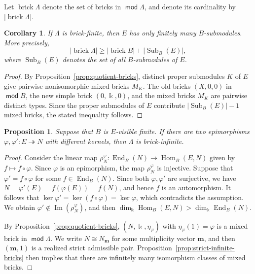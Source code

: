 \documentclass[a4,12pt]{amsart}
\numberwithin{equation}{section} %
\def\Hom{\operatorname{Hom}} %
\def\End{\operatorname{End}} %
\def\mod{\operatorname{\mathsf{mod}}}
\newtheorem{corollary}[theorem]{Corollary} %
\newtheorem{proposition}[theorem]{Proposition} %
\theoremstyle{definition} %
\begin{document}
Let $\operatorname{brick}\Lambda$ denote the set of bricks in $\mod\Lambda$, and denote its cardinality by $|\operatorname{brick}\Lambda|$.

\begin{corollary}\label{cor:submodule-bound}
If $\Lambda$ is brick-finite, then $E$ has only finitely many $B$-submodules. More precisely,
\[
|\operatorname{brick}\Lambda|
\geq
|\operatorname{brick}B|
+
|\operatorname{Sub}_B(E)|,
\]
where $\operatorname{Sub}_B(E)$ denotes the set of all $B$-submodules of $E$.
\end{corollary}
\begin{proof}
By Proposition~\ref{prop:quotient-bricks}, distinct proper submodules $K$ of $E$ give pairwise nonisomorphic mixed bricks $M_K$. The old bricks $(X,0,0)$ in $\mod B$, the new simple brick $(0,\Bbbk,0)$, and the mixed bricks $M_K$ are pairwise distinct types. Since the proper submodules of $E$ contribute $|\operatorname{Sub}_B(E)|-1$ mixed bricks, the stated inequality follows.
\end{proof}


\begin{proposition}
Suppose that $B$ is $E$-visible finite. If there are two epimorphisms $\varphi,\varphi'\colon E\twoheadrightarrow N$ with different kernels, then $\Lambda$ is brick-infinite.
\end{proposition}
\begin{proof}
Consider the linear map $\rho_{N}^\varphi \colon \End_B(N)\rightarrow \Hom_B(E,N)$ given by $f\mapsto f\circ \varphi$. Since $\varphi$ is an epimorphism, the map $\rho_{N}^\varphi $ is injective. Suppose that $\varphi'=f\circ \varphi$ for some $f\in\End_B(N)$. Since both $\varphi, \varphi'$ are surjective, we have $N=\varphi'(E)=f(\varphi(E))=f(N)$, and hence $f$ is an automorphism. It follows that $\ker\varphi'=\ker(f\circ \varphi)=\ker\varphi$, which contradicts the assumption. We obtain $\varphi'\notin\operatorname{Im}(\rho_{N}^\varphi )$, and then $\dim_{\Bbbk}\Hom_B(E,N)>
\dim_{\Bbbk}\End_B(N)$.

By Proposition~\ref{prop:quotient-bricks}, $(N,\Bbbk,\eta_\varphi)$ with $\eta_\varphi(1)=\varphi$ is a mixed brick in $\mod \Lambda$. We write $N\cong N_{\mathbf{m}}$ for some multiplicity vector $\mathbf{m}$, and then $(\mathbf{m}, 1)$ is a realized strict admissible pair.  Proposition~\ref{prop:strict-infinite-bricks} then implies that there are infinitely many isomorphism classes of mixed bricks.
\end{proof}
\end{document}
